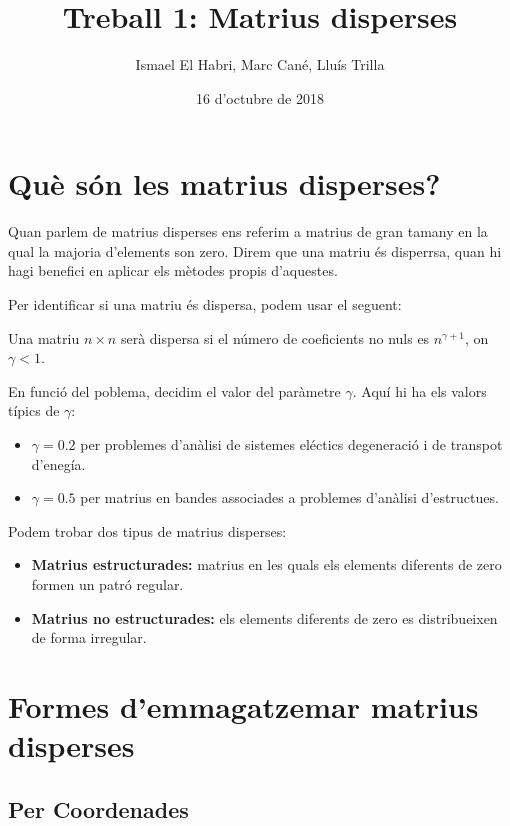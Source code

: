 \documentclass[11pt,a4paper,twoside]{report}
\begin{document}
  
  \title{Treball 1: Matrius disperses}
  \author{Ismael El Habri, Marc Cané, Lluís Trilla}
  \date{16 d'octubre de 2018}
  \maketitle
  
  \tableofcontents
  
  
  \chapter{Què són les matrius disperses?}
  
  Quan parlem de matrius disperses ens referim a matrius de gran tamany en la qual la majoria d'elements son zero. Direm que 
  una matriu és disperrsa, quan hi hagi benefici en aplicar els mètodes propis d'aquestes. 
  
  Per identificar si una matriu és dispersa, podem usar el seguent:
    
  \qquad Una matriu $n \times n$ serà dispersa si el número de coeficients no nuls es $n^{\gamma+1}$, on $\gamma < 1$.

  En funció del poblema, decidim el valor del paràmetre $\gamma$. Aquí hi ha els valors típics de $\gamma$:
  \begin{itemize}
    \item $\gamma=0.2$ per problemes d'anàlisi de sistemes eléctics degeneració i de transpot d'enegía.
    \item $\gamma=0.5$ per matrius en bandes associades a problemes d'anàlisi d'estructues.
  \end {itemize}



  Podem trobar dos tipus de matrius disperses:
  \begin{itemize}
    \item \textbf{Matrius estructurades:} matrius en les quals els elements diferents de zero formen un patró regular.
    \item \textbf{Matrius no estructurades:} els elements diferents de zero es distribueixen de forma irregular.
  \end{itemize}

  \chapter{Formes d'emmagatzemar matrius disperses}
  
  \section{Per Coordenades}
  
\end{document}
